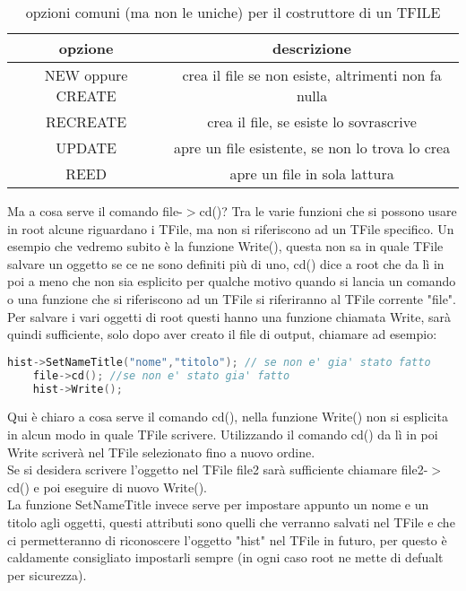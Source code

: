 \begin{table}[h]
	\begin{tabular}{|c|c|}
		\hline
		opzione	& descrizione \\
		\hline
		NEW  oppure CREATE	& crea il file se non esiste, altrimenti non fa nulla \\
		\hline
		RECREATE	& crea il file, se esiste lo sovrascrive \\
		\hline
		UPDATE	& apre un file esistente, se non lo trova lo crea \\
		\hline
		REED	& apre un file in sola lattura \\
		\hline
	\end{tabular}
\label{tab:TFile_options}
\caption{\centering opzioni comuni (ma non le uniche) per il costruttore di un TFILE}
\end{table}
Ma a cosa serve il comando file-$>$cd()? Tra le varie funzioni che si possono usare in root alcune riguardano i TFile, ma non si riferiscono ad un TFile specifico. Un esempio che vedremo subito è la funzione Write(), questa non sa in quale TFile salvare un oggetto se ce ne sono definiti più di uno, cd() dice a root che da lì in poi a meno che non sia esplicito per qualche motivo quando si lancia un comando o una funzione che si riferiscono ad un TFile si riferiranno al TFile corrente "file".\\
Per salvare i vari oggetti di root questi hanno una funzione chiamata Write, sarà quindi sufficiente, solo dopo aver creato il file di output, chiamare ad esempio:
\begin{lstlisting}[language=C++,label={cod1},mathescape=true,breaklines=true]
	hist->SetNameTitle("nome","titolo"); // se non e' gia' stato fatto
	file->cd(); //se non e' stato gia' fatto
	hist->Write();
\end{lstlisting}
Qui è chiaro a cosa serve il comando cd(), nella funzione Write() non si esplicita in alcun modo in quale TFile scrivere. Utilizzando il comando cd() da lì in poi Write scriverà nel TFile selezionato fino a nuovo ordine.\\
Se si desidera scrivere l'oggetto nel TFile file2 sarà sufficiente chiamare file2-$>$cd() e poi eseguire di nuovo Write().\\
La funzione SetNameTitle invece serve per impostare appunto un nome e un titolo agli oggetti, questi attributi sono quelli che verranno salvati nel TFile e che ci permetteranno di riconoscere l'oggetto "hist" nel TFile in futuro, per questo è caldamente consigliato impostarli sempre (in ogni caso root ne mette di defualt per sicurezza).\\
